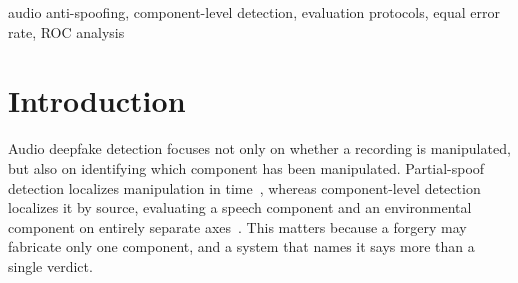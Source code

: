 \documentclass{article}
\begin{document}
\ninept
\maketitle

\begin{abstract}
Component-level audio anti-spoofing scores speech and environmental components on separate axes. An untouched recording has no separately generated component: on both axes it is a structural zero, not a missing value. The ESDD2 evaluation plan nonetheless pools these clips with genuine bona fide mixtures. This rule distorts the reported Equal Error Rate (EER): varying only the constant score assigned to structural zeros moves a fixed model's environmental EER between $0.5382$ and $0.1412$. We prove that weighted-area summaries such as AUC survive this pooling while EER admits no aggregation rule; published pooled EERs determine none of $55$ pairwise comparisons among eleven challenge systems. No label-free per-clip score reduction recovers the component-only value, so the correction belongs in the protocol. Evaluating each component only where it applies recovers it exactly; a reader using only the submitted scores comes within $0.0068$ rather than $0.2246$.
\end{abstract}

\begin{keywords}
audio anti-spoofing, component-level detection, evaluation protocols,
equal error rate, ROC analysis
\end{keywords}

\section{Introduction}
\label{sec:intro}

Audio deepfake detection focuses not only on whether a recording is manipulated, but also on identifying which component has been manipulated. Partial-spoof detection localizes manipulation in time~\cite{partialspoof}, whereas component-level detection localizes it by source, evaluating a speech component and an environmental component on entirely separate axes~\cite{compspoof2026,esdd2,pcmix2026}.
This matters because a forgery may fabricate only one component, and a system that names it says more than a single verdict.
\end{document}
